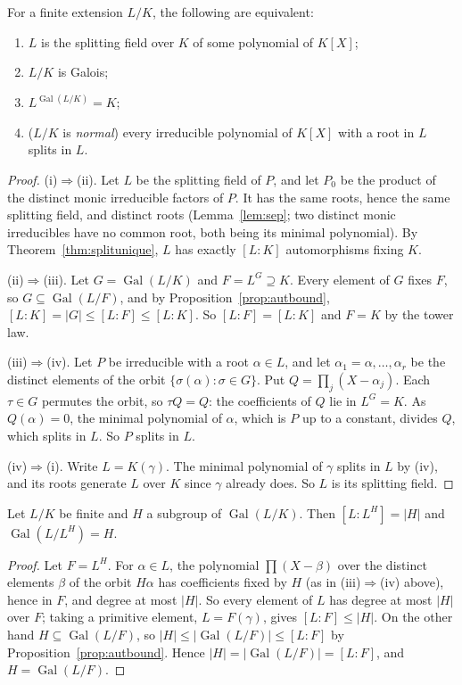 \begin{theorem}\label{thm:galoischar}
For a finite extension $L/K$, the following are equivalent:
\begin{enumerate}[label=(\roman*)]
\item $L$ is the splitting field over $K$ of some polynomial of $K[X]$;
\item $L/K$ is Galois;
\item $L^{\operatorname{Gal}(L/K)}=K$;
\item ($L/K$ is \emph{normal}) every irreducible polynomial of $K[X]$ with a root in $L$ splits in $L$.
\end{enumerate}
\end{theorem}
\begin{proof}
(i)$\Rightarrow$(ii). Let $L$ be the splitting field of $P$, and let $P_0$ be the product of the distinct monic irreducible factors of $P$. It has the same roots, hence the same splitting field, and distinct roots (Lemma~\ref{lem:sep}; two distinct monic irreducibles have no common root, both being its minimal polynomial). By Theorem~\ref{thm:splitunique}, $L$ has exactly $[L:K]$ automorphisms fixing $K$.

(ii)$\Rightarrow$(iii). Let $G=\operatorname{Gal}(L/K)$ and $F=L^G\supseteq K$. Every element of $G$ fixes $F$, so $G\subseteq\operatorname{Gal}(L/F)$, and by Proposition~\ref{prop:autbound}, $[L:K]=|G|\le[L:F]\le[L:K]$. So $[L:F]=[L:K]$ and $F=K$ by the tower law.

(iii)$\Rightarrow$(iv). Let $P$ be irreducible with a root $\alpha\in L$, and let $\alpha_1=\alpha,\dots,\alpha_r$ be the distinct elements of the orbit $\{\sigma(\alpha):\sigma\in G\}$. Put $Q=\prod_{j}(X-\alpha_j)$. Each $\tau\in G$ permutes the orbit, so $\tau Q=Q$: the coefficients of $Q$ lie in $L^G=K$. As $Q(\alpha)=0$, the minimal polynomial of $\alpha$, which is $P$ up to a constant, divides $Q$, which splits in $L$. So $P$ splits in $L$.

(iv)$\Rightarrow$(i). Write $L=K(\gamma)$. The minimal polynomial of $\gamma$ splits in $L$ by (iv), and its roots generate $L$ over $K$ since $\gamma$ already does. So $L$ is its splitting field.
\end{proof}

\begin{lemma}[Artin]\label{lem:artin}
Let $L/K$ be finite and $H$ a subgroup of $\operatorname{Gal}(L/K)$. Then $[L:L^H]=|H|$ and $\operatorname{Gal}(L/L^H)=H$.
\end{lemma}
\begin{proof}
Let $F=L^H$. For $\alpha\in L$, the polynomial $\prod(X-\beta)$ over the distinct elements $\beta$ of the orbit $H\alpha$ has coefficients fixed by $H$ (as in (iii)$\Rightarrow$(iv) above), hence in $F$, and degree at most $|H|$. So every element of $L$ has degree at most $|H|$ over $F$; taking a primitive element, $L=F(\gamma)$, gives $[L:F]\le|H|$. On the other hand $H\subseteq\operatorname{Gal}(L/F)$, so $|H|\le|\operatorname{Gal}(L/F)|\le[L:F]$ by Proposition~\ref{prop:autbound}. Hence $|H|=|\operatorname{Gal}(L/F)|=[L:F]$, and $H=\operatorname{Gal}(L/F)$.
\end{proof}


